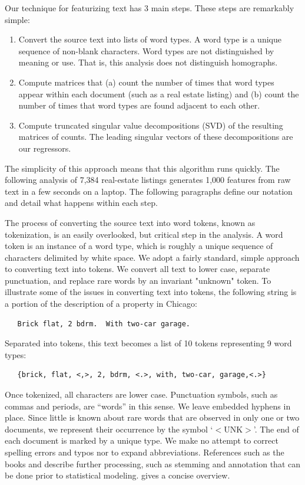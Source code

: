 \documentclass[12pt]{article}
\begin{document}
 Our technique for featurizing text has 3 main steps.  These steps are
 remarkably simple:
 \begin{enumerate}
   \item Convert the source text into lists of word types.  A word type is a
 unique sequence of non-blank characters.  Word types are not distinguished by meaning or use.  That is, this analysis does not distinguish homographs.
   \item Compute matrices that (a) count the number of times that word types
 appear within each document (such as a real estate listing) and (b) count the number of times that word types are found adjacent to each other.
   \item Compute truncated singular value decompositions (SVD) of the resulting
 matrices of counts. The leading singular vectors of these decompositions are our regressors.
 \end{enumerate}
   The simplicity of this approach means that this algorithm runs quickly.  The following analysis of 7,384 real-estate listings generates 1,000 features from raw text in a few seconds on a laptop.  The following paragraphs define our notation and detail what happens within each step. 


 The process of converting the source text into word tokens, known as
 tokenization, is an easily overlooked, but critical step in the analysis.  A
 word token is an instance of a word type, which is roughly a unique sequence of characters delimited by white space.  We adopt a fairly standard, simple approach to converting text into tokens.  We convert all text to lower case, separate punctuation, and replace rare words by an invariant "unknown" token.   To illustrate some of the issues in converting text into tokens, the following string is a portion of the description of a property in Chicago:
 \begin{verbatim}
   Brick flat, 2 bdrm.  With two-car garage. \end{verbatim} 
 \noindent
 Separated into tokens, this text becomes a list of 10 tokens representing 9
 word types:
 \begin{verbatim}
   {brick, flat, <,>, 2, bdrm, <.>, with, two-car, garage,<.>} \end{verbatim} 
 \noindent
 Once tokenized, all characters are lower case.  Punctuation
 symbols, such as commas and periods, are ``words'' in this sense. We leave embedded hyphens in place.  Since little
 is known about rare words that are observed in only one or two documents, we
 represent their occurrence by the symbol `$<$UNK$>$'.  The end of each document is marked by a unique type.  We make no attempt to correct spelling errors and typos nor to expand abbreviations. References such as the books \citet{manning99} and \citet{jurafsky09} describe further processing, such as stemming and annotation that can be done prior to statistical modeling. \citet{turney10} gives a concise overview.
 
\end{document}
